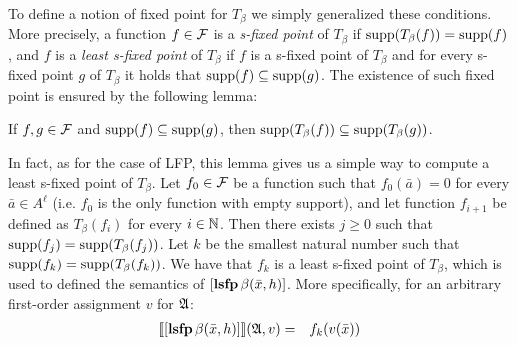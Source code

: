 To define a notion of fixed point for $T_\beta$ we simply generalized these conditions. More precisely, %
a function $f \in \mathcal{F}$ is a {\em s-fixed point} of $T_{\beta}$ if $\text{\rm supp}(T_\beta(f)) = \text{\rm supp}(f)$, and $f$ is a {\em least s-fixed point} of $T_{\beta}$ if $f$ is a s-fixed point of $T_\beta$ and for every s-fixed point $g$ of $T_\beta$ it holds that $\text{\rm supp}(f) \subseteq \text{\rm supp}(g)$. The existence of such fixed point is ensured by the following lemma:
\begin{lemma}\label{lem-support}
If $f,g \in \mathcal{F}$ and $\text{\rm supp}(f) \subseteq \text{\rm supp}(g)$, then $\text{\rm supp}(T_\beta(f)) \subseteq \text{\rm supp}(T_\beta(g))$.
\end{lemma}
In fact, as for the case of LFP, this lemma gives us a simple way to compute a least s-fixed point of $T_\beta$. Let $f_0 \in \mathcal{F}$ be a function such that $f_0(\bar a) = 0$ for every $\bar a \in A^\ell$ (i.e. $f_0$ is the only function with empty support), and let function $f_{i+1}$ be defined as $T_\beta(f_i)$ for every $i \in \mathbb{N}$. Then there exists $j \geq 0$ such that $\text{\rm supp}(f_j) = \text{\rm supp}(T_\beta(f_j))$. Let $k$ be the smallest natural number such that $\text{\rm supp}(f_{k}) = \text{\rm supp}(T_\beta(f_k))$. We have that $f_k$ is a least s-fixed point of $T_\beta$, which is used to defined the semantics of $[{\bf lsfp} \, \beta(\bar{x}, h)]$. More specifically, for an arbitrary first-order assignment $v$ for $\mathfrak{A}$:
\begin{eqnarray*}
{\llbracket{}{[{\bf lsfp} \, \beta(\bar{x}, h)]}\rrbracket}(\mathfrak{A},v) & = & f_{k}(v(\bar{x}))
\end{eqnarray*}

